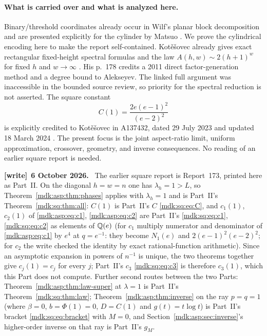 \documentclass[11pt,letterpaper]{article}
\numberwithin{equation}{section}
\theoremstyle{remark}\newtheorem{remark}[theorem]{Remark}
\newenvironment{writenote}[1][]{\par\smallskip\begingroup\small
 \noindent\textbf{[write]}\if\relax\detokenize{#1}\relax\else~\textbf{#1.}\fi\ }%
 {\par\endgroup\smallskip}
\begin{document}
\paragraph{What is carried over and what is analyzed here.}
Binary/threshold coordinates already occur in Wilf's planar block decomposition \cite{wilf} and are presented explicitly for the cylinder by Matsuo \cite{matsuo}. We prove the cylindrical encoding here to make the report self-contained. Kot\v{e}\v{s}ovec already gives exact rectangular fixed-height spectral formulas and the law $A(h,w)\sim2(h+1)^w$ for fixed $h$ and $w\to\infty$ \cite[p.~192]{kotesovec}. His p.~178 credits a 2011 direct factor-generation method and a degree bound to Alekseyev. The linked full argument was inaccessible in the bounded source review, so priority for the spectral reduction is not asserted. The square constant
\[
C(1)=\frac{2e(e-1)^2}{(e-2)^2}
\]
is explicitly credited to Kot\v{e}\v{s}ovec in A137432, dated 29 July 2023 and updated 18 March 2024 \cite{oeisA137432}. The present focus is the joint aspect-ratio limit, uniform approximation, crossover, geometry, and inverse consequences. No reading of an earlier square report is needed.
\begin{writenote}[6 October 2026]
The earlier square report is Report~173, printed here as Part~II. On the diagonal $h=w=n$ one has $\lambda_h=1>L$, so Theorem~\ref{mdk:asp:thm:phases} applies with $\lambda_h=1$ and is Part~II's Theorem~\ref{mdk:sq:thm:all}: $C(1)$ is Part~II's $C$ \eqref{mdk:sq:eq:C}, and $c_1(1)$, $c_2(1)$ of \eqref{mdk:asp:eq:c1}, \eqref{mdk:asp:eq:c2} are Part~II's \eqref{mdk:sq:eq:c1}, \eqref{mdk:sq:eq:c2} as elements of $\mathbb Q(e)$ (for $c_1$ multiply numerator and denominator of \eqref{mdk:asp:eq:c1} by $e^4$ at $q=e^{-1}$: they become $N_1(e)$ and $2(e-1)^2(e-2)^2$; for $c_2$ the write checked the identity by exact rational-function arithmetic). Since an asymptotic expansion in powers of $n^{-1}$ is unique, the two theorems together give $c_j(1)=c_j$ for every $j$; Part~II's $c_3$ \eqref{mdk:sq:eq:c3} is therefore $c_3(1)$, which this Part does not compute. Further second routes between the two Parts: Theorem~\ref{mdk:asp:thm:law-super} at $\lambda=1$ is Part~II's Theorem~\ref{mdk:sq:thm:law}; Theorem~\ref{mdk:asp:thm:inverse} on the ray $p=q=1$ (where $\beta=0$, $b=\Phi(1)=0$, $D=C(1)$ and $g(t)=t\log t$) is Part~II's bracket \eqref{mdk:sq:eq:bracket} with $M=0$, and Section~\ref{mdk:asp:sec:inverse}'s higher-order inverse on that ray is Part~II's $g_M$.
\end{writenote}
\end{document}
